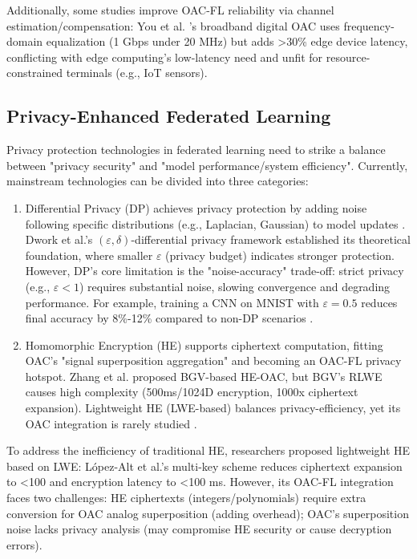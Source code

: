 \documentclass[runningheads]{llncs}
\begin{document}
Additionally, some studies improve OAC-FL reliability via channel estimation/compensation: You et al. \cite{you2023broadband}’s broadband digital OAC uses frequency-domain equalization (1 Gbps under 20 MHz) but adds >30\% edge device latency, conflicting with edge computing’s low-latency need and unfit for resource-constrained terminals (e.g., IoT sensors).
\subsection{Privacy-Enhanced Federated Learning}
Privacy protection technologies in federated learning need to strike a balance between "privacy security" and "model performance/system efficiency". Currently, mainstream technologies can be divided into three categories:
\begin{enumerate}
\item Differential Privacy (DP) achieves privacy protection by adding noise following specific distributions (e.g., Laplacian, Gaussian) to model updates . Dwork\cite{dwork2014differential} et al.'s $(\varepsilon, \delta)$-differential privacy framework established its theoretical foundation, where smaller $\varepsilon$ (privacy budget) indicates stronger protection. However, DP\cite{10251646}'s core limitation is the "noise-accuracy" trade-off: strict privacy (e.g., $\varepsilon < 1$) requires substantial noise, slowing convergence and degrading performance. For example, training a CNN on MNIST with $\varepsilon = 0.5$ reduces final accuracy by 8\%-12\% compared to non-DP scenarios .
\item Homomorphic Encryption (HE) supports ciphertext computation, fitting OAC's "signal superposition aggregation" and becoming an OAC-FL privacy hotspot. Zhang\cite{zheng2019sparse} et al. proposed BGV-based HE-OAC, but BGV's RLWE causes high complexity (500ms/1024D encryption, 1000x ciphertext expansion). Lightweight HE (LWE-based) balances privacy-efficiency, yet its OAC integration is rarely studied \cite{yao1982protocols}.
\end{enumerate}
To address the inefficiency of traditional HE, researchers proposed lightweight HE based on LWE: López-Alt\cite{lopez2012fly} et al.'s  multi-key scheme reduces ciphertext expansion to <100 and encryption latency to <100 ms. However, its OAC-FL integration faces two challenges: HE ciphertexts (integers/polynomials) require extra conversion for OAC analog superposition (adding overhead); OAC's superposition noise lacks privacy analysis (may compromise HE security or cause decryption errors).
\end{document}

